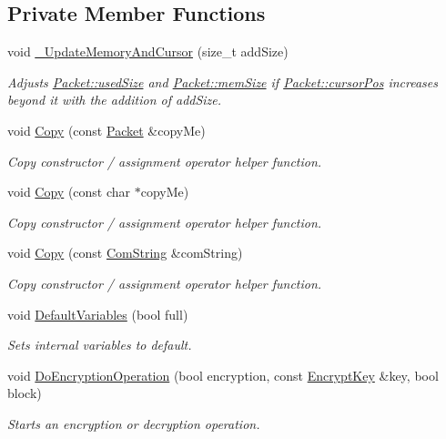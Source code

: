 \subsection*{Private Member Functions}
\begin{DoxyCompactItemize}
\item 
void \hyperlink{class_packet_a6199a7116a99201270755b0c6bead6e0}{\_\-UpdateMemoryAndCursor} (size\_\-t addSize)
\begin{DoxyCompactList}\small\item\em Adjusts \hyperlink{class_packet_a1da1eb4f461522942bada139f0d94acd}{Packet::usedSize} and \hyperlink{class_packet_a1c2e5054d27221467e8db5dc9e71c04a}{Packet::memSize} if \hyperlink{class_packet_acce561b50a43897e8fd0c03222b617bd}{Packet::cursorPos} increases beyond it with the addition of {\itshape addSize\/}. \item\end{DoxyCompactList}\item 
void \hyperlink{class_packet_ae965e1981922f3176ed91a352a152d9f}{Copy} (const \hyperlink{class_packet}{Packet} \&copyMe)
\begin{DoxyCompactList}\small\item\em Copy constructor / assignment operator helper function. \item\end{DoxyCompactList}\item 
void \hyperlink{class_packet_aa25d95a05c5b2b40eb59b44a203d7570}{Copy} (const char $\ast$copyMe)
\begin{DoxyCompactList}\small\item\em Copy constructor / assignment operator helper function. \item\end{DoxyCompactList}\item 
void \hyperlink{class_packet_a41d94997f70041ab7498c07387e9472f}{Copy} (const \hyperlink{class_com_string}{ComString} \&comString)
\begin{DoxyCompactList}\small\item\em Copy constructor / assignment operator helper function. \item\end{DoxyCompactList}\item 
void \hyperlink{class_packet_aa5acb9e08849a417575ad51167051fe9}{DefaultVariables} (bool full)
\begin{DoxyCompactList}\small\item\em Sets internal variables to default. \item\end{DoxyCompactList}\item 
void \hyperlink{class_packet_aa4e03b15b09c1feb607aae889cda4f0f}{DoEncryptionOperation} (bool encryption, const \hyperlink{class_encrypt_key}{EncryptKey} \&key, bool block)
\begin{DoxyCompactList}\small\item\em Starts an encryption or decryption operation. \item\end{DoxyCompactList}\end{DoxyCompactItemize}

